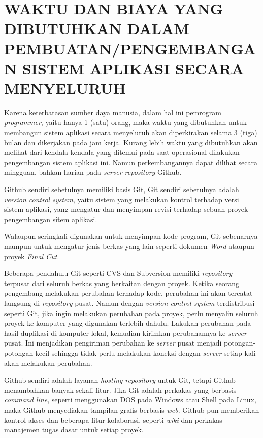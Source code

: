 \documentclass[pdftex,12pt, oneside]{article}
\begin{document}
\section{WAKTU DAN BIAYA YANG DIBUTUHKAN DALAM PEMBUATAN/PENGEMBANGAN SISTEM APLIKASI SECARA MENYELURUH}

Karena keterbatasan sumber daya manusia, dalam hal ini pemrogram \textit{programmer}, yaitu hanya 1 (satu) orang, maka waktu yang dibutuhkan untuk membangun sistem aplikasi secara menyeluruh akan diperkirakan selama 3 (tiga) bulan dan dikerjakan pada jam kerja. Kurang lebih waktu yang dibutuhkan akan melihat dari kendala-kendala yang ditemui pada saat operasional dilakukan pengembangan sistem aplikasi ini. Namun perkembangannya dapat dilihat secara mingguan, bahkan harian pada \textit{server repository} Github.

Github sendiri sebetulnya memiliki basis Git, Git sendiri sebetulnya adalah \textit{version control system}, yaitu sistem yang melakukan kontrol terhadap versi sistem aplikasi, yang mengatur dan menyimpan revisi terhadap sebuah proyek pengembangan sitem aplikasi. 

Walaupun seringkali digunakan untuk menyimpan kode program, Git sebenarnya mampun untuk mengatur jenis berkas yang lain seperti dokumen \textit{Word} ataupun proyek \textit{Final Cut}.

Beberapa pendahulu Git seperti CVS dan Subversion memiliki \textit{repository} terpusat dari seluruh berkas yang berkaitan dengan proyek. Ketika seorang pengembang melakukan perubahan terhadap kode, perubahan ini akan tercatat langsung di \textit{repository} pusat. Namun dengan \textit{version control system} terdistribusi seperti Git, jika ingin melakukan perubahan pada proyek, perlu menyalin seluruh proyek ke komputer yang digunakan terlebih dahulu. Lakukan perubahan pada hasil duplikasi di komputer lokal, kemudian kirimkan perubahannya ke \textit{server} pusat. Ini menjadikan pengiriman perubahan ke \textit{server} pusat menjadi potongan-potongan kecil sehingga tidak perlu melakukan koneksi dengan \textit{server} setiap kali akan melakukan perubahan.

Github sendiri adalah layanan \textit{hosting repository} untuk Git, tetapi Github menambahkan banyak sekali fitur. Jika Git adalah perkakas yang berbasis \textit{command line}, seperti menggunakan DOS pada Windows atau Shell pada Linux, maka Github menyediakan tampilan grafis berbasis \textit{web}. Github pun memberikan kontrol akses dan beberapa fitur kolaborasi, seperti \textit{wiki} dan perkakas manajemen tugas dasar untuk setiap proyek.
\end{document}
